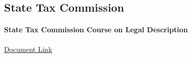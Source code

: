 
\subsection{State Tax Commission}
\paragraph[STC Legal Description Course]{State Tax Commission Course on Legal Description}
\href{../../documentation/readingRoom/stateResources/State_Tax_Commission_Legal_Descriptions_Course_346936_7.pdf}{Document Link}

